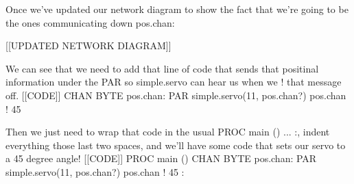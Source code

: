 	Once we've updated our network diagram to show the fact that we're going to be the ones communicating down pos.chan:

		[[UPDATED NETWORK DIAGRAM]]

 	We can see that we need to add that line of code that sends that positinal information under the PAR so simple.servo can hear us when we ! that message off.
		[[CODE]]
		CHAN BYTE pos.chan:
		PAR
		  simple.servo(11, pos.chan?)
		  pos.chan ! 45

	Then we just need to wrap that code in the usual PROC main () ... :, indent everything those last two spaces, and we'll have some code that sets our servo to a 45 degree angle!
		[[CODE]]
		PROC main ()
		  CHAN BYTE pos.chan:
		  PAR
		    simple.servo(11, pos.chan?)
		    pos.chan ! 45
		:
